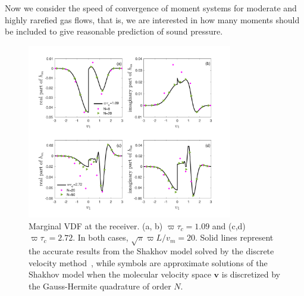 
Now we consider the speed of convergence of moment systems for moderate and highly rarefied gas flows, that is, we are interested in how many moments should be included to give reasonable prediction of sound pressure. %



\begin{figure}[t]
	\centering
	\includegraphics[width=0.8\textwidth]{FluidDynamic/IMG/vdf_sound.pdf}
	\caption{ Marginal VDF at the receiver. (a, b) $\varpi{\tau_c}=1.09$ and (c,d) $\varpi{\tau_c}=2.72$. In both cases, $\sqrt{\pi}\varpi{L}/v_m=20$. Solid lines represent the accurate results from the Shakhov model solved by the discrete velocity method~\citep{SuArXiv2019}, while symbols are approximate solutions of the Shakhov model when the molecular velocity space $\bm{v}$ is discretized by the Gauss-Hermite quadrature of order $N$.  }
	\label{fig:vdf_sound_convergence}
\end{figure}

